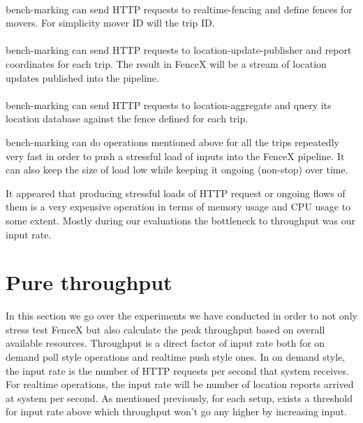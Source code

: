 \documentclass[a4]{report}
\begin{document}
        \paragraph{}
        bench-marking can send HTTP requests to realtime-fencing and define fences for movers.
        For simplicity mover ID will the trip ID.

        \paragraph{}
        bench-marking can send HTTP requests to location-update-publisher and report coordinates for each trip.
        The result in FenceX will be a stream of location updates published into the pipeline.

        \paragraph{}
        bench-marking can send HTTP requests to location-aggregate and query its location database against the fence
        defined for each trip.

        bench-marking can do operations mentioned above for all the trips repeatedly very fast in order to push a
        stressful load of inputs into the FenceX pipeline.
        It can also keep the size of load low while keeping it ongoing (non-stop) over time.

        It appeared that producing stressful loads of HTTP request or ongoing flows of them is a very expensive operation
        in terms of memory usage and CPU usage to some extent.
        Mostly during our evaluations the bottleneck to throughput was our input rate.

        \section{Pure throughput}
        In this section we go over the experiments we have conducted in order to not only stress test FenceX but also
        calculate the peak throughput based on overall available resources.
        Throughput is a direct factor of input rate both for on demand poll style operations and realtime push style ones.
        In on demand style, the input rate is the number of HTTP requests per second that system receives.
        For realtime operations, the input rate will be number of location reports arrived at system per second.
        As mentioned previously, for each setup, exists a threshold for input rate above which throughput won't go any
        higher by increasing input.
\end{document}

